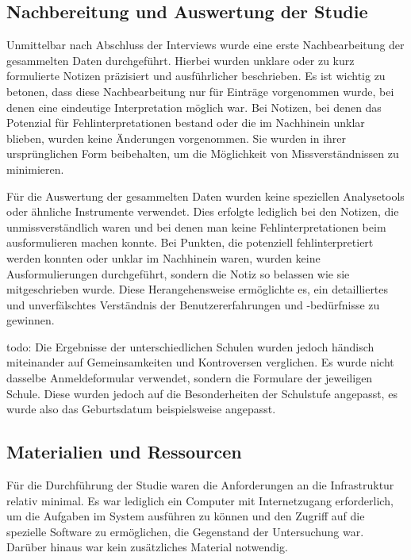 \subsection{Nachbereitung und Auswertung der Studie}

Unmittelbar nach Abschluss der Interviews wurde eine erste Nachbearbeitung der gesammelten Daten durchgeführt. Hierbei wurden unklare oder zu kurz formulierte Notizen präzisiert und ausführlicher beschrieben. Es ist wichtig zu betonen, dass diese Nachbearbeitung nur für Einträge vorgenommen wurde, bei denen eine eindeutige Interpretation möglich war. Bei Notizen, bei denen das Potenzial für Fehlinterpretationen bestand oder die im Nachhinein unklar blieben, wurden keine Änderungen vorgenommen. Sie wurden in ihrer ursprünglichen Form beibehalten, um die Möglichkeit von Missverständnissen zu minimieren.

Für die Auswertung der gesammelten Daten wurden keine speziellen Analysetools oder ähnliche Instrumente verwendet. Dies erfolgte lediglich bei den Notizen, die unmissverständlich waren und bei denen man keine Fehlinterpretationen beim ausformulieren machen konnte. Bei Punkten, die potenziell fehlinterpretiert werden konnten oder unklar im Nachhinein waren, wurden keine Ausformulierungen durchgeführt, sondern die Notiz so belassen wie sie mitgeschrieben wurde. Diese Herangehensweise ermöglichte es, ein detailliertes und unverfälschtes Verständnis der Benutzererfahrungen und -bedürfnisse zu gewinnen.


todo: Die Ergebnisse der unterschiedlichen Schulen wurden jedoch händisch miteinander auf Gemeinsamkeiten und Kontroversen verglichen. 
Es wurde nicht dasselbe Anmeldeformular verwendet, sondern die Formulare der jeweiligen Schule. Diese wurden jedoch auf die Besonderheiten der Schulstufe angepasst, es wurde also das Geburtsdatum beispielsweise angepasst.

\subsection{Materialien und Ressourcen}

Für die Durchführung der Studie waren die Anforderungen an die Infrastruktur relativ minimal. Es war lediglich ein Computer mit Internetzugang erforderlich, um die Aufgaben im System ausführen zu können und den Zugriff auf die spezielle Software zu ermöglichen, die Gegenstand der Untersuchung war.\\
Darüber hinaus war kein zusätzliches Material notwendig.

